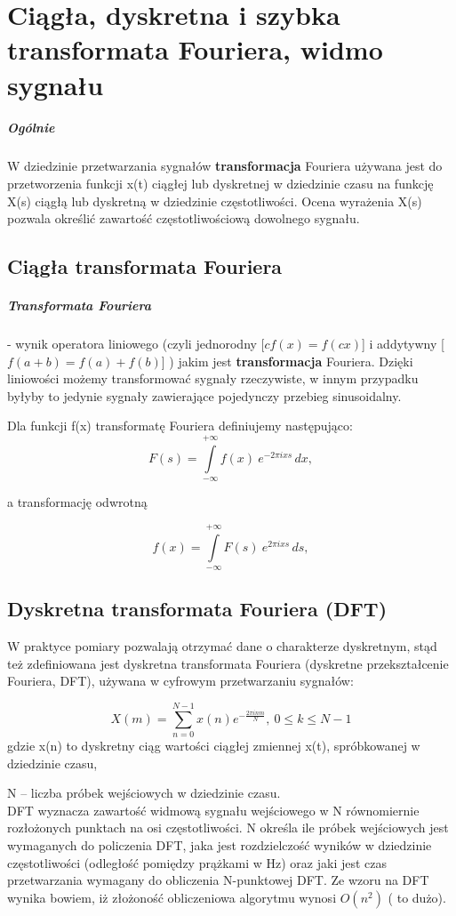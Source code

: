 \documentclass[a4paper,twoside]{report}
\begin{document}
\chapter{Ciągła, dyskretna i szybka transformata Fouriera, widmo sygnału}
\paragraph{Ogólnie}
 W dziedzinie przetwarzania sygnałów \textbf{transformacja} Fouriera używana jest do przetworzenia funkcji x(t) ciągłej lub dyskretnej w dziedzinie czasu na funkcję X(s) ciągłą lub dyskretną w dziedzinie częstotliwości. Ocena wyrażenia X(s) pozwala określić zawartość częstotliwościową dowolnego sygnału. 

\section{Ciągła transformata Fouriera}
\paragraph{Transformata Fouriera}
 - wynik operatora liniowego (czyli jednorodny [$ cf(x) = f(cx) $] i addytywny [$ f(a+b)=f(a)+f(b) $] ) jakim jest \textbf{transformacja} Fouriera. Dzięki liniowości możemy transformować sygnały rzeczywiste, w innym przypadku byłyby to jedynie sygnały zawierające pojedynczy przebieg sinusoidalny.

Dla funkcji f(x) transformatę Fouriera definiujemy następująco:
$$ F(s) = \int\limits_{-\infty}^{+\infty} f(x)\ e^{- 2\pi i x s}\,dx, $$

a transformację odwrotną

$$ f(x) = \int\limits_{-\infty}^{+\infty} F(s)\ e^{2\pi i x s}\,ds, $$

\section{Dyskretna transformata Fouriera (DFT)}
W praktyce pomiary pozwalają otrzymać dane o charakterze dyskretnym, stąd też zdefiniowana jest dyskretna transformata Fouriera (dyskretne przekształcenie Fouriera, DFT), używana w cyfrowym przetwarzaniu sygnałów:

$$ X(m)= \sum_{n=0}^{N-1}{x(n) e^{- \frac{2 \pi i n m}{N}}} , \ 0 \le k \le N-1 $$
gdzie x(n) to dyskretny ciąg wartości ciągłej zmiennej x(t), spróbkowanej w dziedzinie czasu, 

N – liczba próbek wejściowych w dziedzinie czasu. \\
 DFT wyznacza zawartość widmową sygnału wejściowego w N równomiernie rozłożonych punktach na osi częstotliwości. N określa ile próbek wejściowych jest wymaganych do policzenia DFT, jaka jest rozdzielczość wyników w dziedzinie częstotliwości (odległość pomiędzy prążkami w Hz) oraz jaki jest czas przetwarzania wymagany do obliczenia N-punktowej DFT. Ze wzoru na DFT wynika bowiem, iż złożoność obliczeniowa algorytmu wynosi $ O(n^2) $ ( to dużo).
\end{document}
